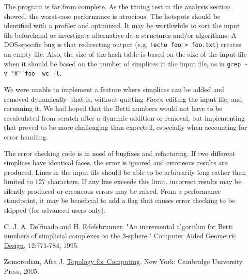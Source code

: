 \documentclass{article}
\begin{document}
The program is far from complete. As the timing test in the
analysis section showed, the worst-case performance is
atrocious. The hotspots should be identified with a profiler and
optimized. It may be worthwhile to sort the
input file beforehand or investigate alternative data structures
and/or algorithms. A DOS-specific bug is that redirecting
output (e.g. \texttt{!echo foo \textgreater\ foo.txt})
creates an empty file.
Also, the size of the hash table is based on the size of the
input file when it should be based on the number of simplices
in the input file, as in
\texttt{grep -v "\#" foo \textbar\ wc -l}.

We were unable to implement a feature where
simplices can be added and removed dynamically- that is, without
quitting \emph{Faces}, editing the input file, and rerunning it.
We had hoped that the Betti numbers would not have to be
recalculated from scratch after a dynamic addition or removal,
but implementing that proved to be more challenging than expected,
especially when accounting for error handling.

The error checking code is in need of bugfixes and refactoring.
If two different simplices have identical faces, the error is
ignored and erroneous results are produced.
Lines in the input file should be able to be arbitrarily long
rather than limited to 127 characters. If any line exceeds
this limit, incorrect results may be silently produced or
erroneous errors may be raised.
From a performance standpoint, it may be beneficial to add
a flag that causes error checking to be skipped (for advanced
users only).

\begin{thebibliography}{9}

C. J. A. Delfinado and H. Edelsbrunner. "An incremental
algorithm for Betti numbers of simplicial complexes on
the 3-sphere." \underline{Computer Aided Geometric Design},
12:771-784, 1995.

Zomorodian, Afra J. \underline{Topology for Computing}.
New York: Cambridge University Press, 2005.

\end{thebibliography}
\end{document}
